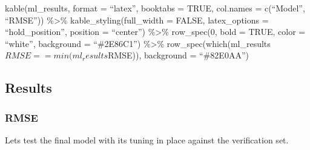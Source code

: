 \documentclass[
]{article}
\newenvironment{Shaded}{\begin{snugshade}}{\end{snugshade}}
\newcommand{\AttributeTok}[1]{\textcolor[rgb]{0.13,0.29,0.53}{#1}}
\newcommand{\CommentTok}[1]{\textcolor[rgb]{0.56,0.35,0.01}{\textit{#1}}}
\newcommand{\FunctionTok}[1]{\textcolor[rgb]{0.13,0.29,0.53}{\textbf{#1}}}
\newcommand{\NormalTok}[1]{#1}
\newcommand{\OtherTok}[1]{\textcolor[rgb]{0.56,0.35,0.01}{#1}}
\newcommand{\SpecialCharTok}[1]{\textcolor[rgb]{0.81,0.36,0.00}{\textbf{#1}}}
\newcommand{\StringTok}[1]{\textcolor[rgb]{0.31,0.60,0.02}{#1}}
\begin{document}
\begin{Shaded}
\end{Shaded}

kable(ml\_results, format = ``latex'', booktabs = TRUE, col.names =
c(``Model'', ``RMSE'')) \%\textgreater\% kable\_styling(full\_width =
FALSE, latex\_options = ``hold\_position'', position = ``center'')
\%\textgreater\% row\_spec(0, bold = TRUE, color = ``white'', background
= ``\#2E86C1'') \%\textgreater\%
row\_spec(which(ml\_results\(RMSE == min(ml_results\)RMSE)), background
= ``\#82E0AA'')

\newpage

\hypertarget{results}{%
\subsection{Results}\label{results}}

\hypertarget{rmse}{%
\subsubsection{RMSE}\label{rmse}}

Lets test the final model with its tuning in place against the
verification set.
\end{document}
